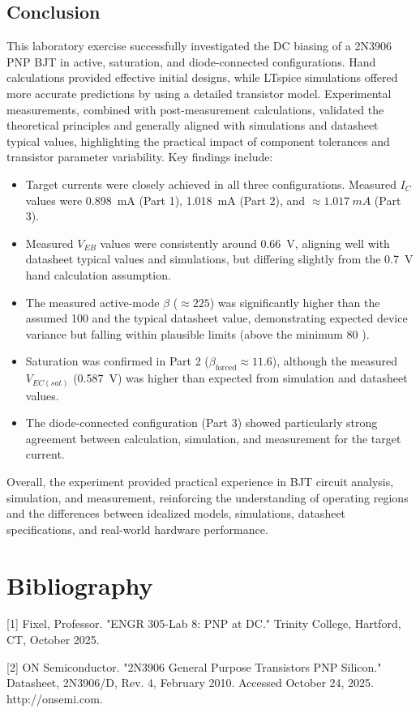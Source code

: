 \documentclass[12pt]{article}
\begin{document}
\subsection{Conclusion}
This laboratory exercise successfully investigated the DC biasing of a 2N3906 PNP BJT in active, saturation, and diode-connected configurations. Hand calculations provided effective initial designs, while LTspice simulations offered more accurate predictions by using a detailed transistor model. Experimental measurements, combined with post-measurement calculations, validated the theoretical principles and generally aligned with simulations and datasheet typical values, highlighting the practical impact of component tolerances and transistor parameter variability. Key findings include:
\begin{itemize}
    \item Target currents were closely achieved in all three configurations. Measured $I_C$ values were \SI{0.898}{mA} (Part 1), \SI{1.018}{mA} (Part 2), and $\approx \SI{1.017}{mA}$ (Part 3).
    \item Measured $V_{EB}$ values were consistently around \SI{0.66}{V}, aligning well with datasheet typical values and simulations, but differing slightly from the \SI{0.7}{V} hand calculation assumption.
    \item The measured active-mode $\beta$ ($\approx 225$) was significantly higher than the assumed 100 and the typical datasheet value, demonstrating expected device variance but falling within plausible limits (above the minimum 80 ).
    \item Saturation was confirmed in Part 2 ($\beta_{\text{forced}} \approx 11.6$), although the measured $V_{EC(sat)}$ (\SI{0.587}{V}) was higher than expected from simulation and datasheet values.
    \item The diode-connected configuration (Part 3) showed particularly strong agreement between calculation, simulation, and measurement for the target current.
\end{itemize}
Overall, the experiment provided practical experience in BJT circuit analysis, simulation, and measurement, reinforcing the understanding of operating regions and the differences between idealized models, simulations, datasheet specifications, and real-world hardware performance.

\section{Bibliography}
[1] Fixel, Professor. "ENGR 305-Lab 8: PNP at DC." Trinity College, Hartford, CT, October 2025.
\newline

[2] ON Semiconductor. "2N3906 General Purpose Transistors PNP Silicon." Datasheet, 2N3906/D, Rev. 4, February 2010. Accessed October 24, 2025. http://onsemi.com.
\end{document}
